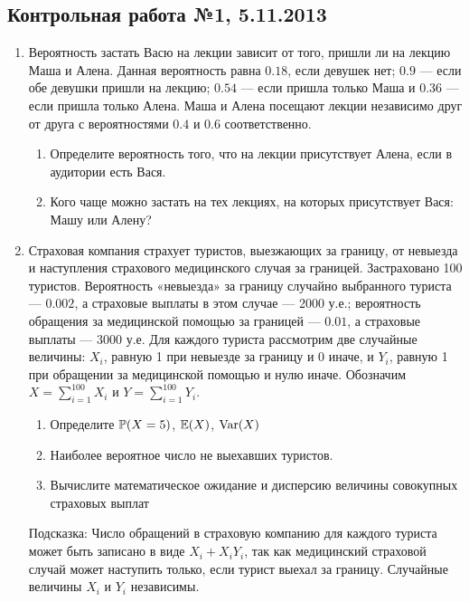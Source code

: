 \subsection{Контрольная работа №1, 5.11.2013}

\begin{enumerate}
\item Вероятность застать Васю на лекции зависит от того, пришли ли на лекцию Маша и Алена. Данная вероятность равна $0.18$, если девушек нет; $0.9$ — если обе девушки пришли на лекцию; $0.54$ — если пришла только Маша и $0.36$ — если пришла только Алена. Маша и Алена посещают лекции независимо друг от друга с вероятностями $0.4$ и $0.6$ соответственно.
\begin{enumerate}
\item Определите вероятность того, что на лекции присутствует Алена, если в аудитории есть Вася.
\item Кого чаще можно застать на тех лекциях, на которых присутствует Вася: Машу или Алену?
\end{enumerate}


\item Страховая компания страхует туристов, выезжающих за границу, от невыезда и наступления страхового медицинского случая за границей. Застраховано 100 туристов. Вероятность «невыезда» за границу случайно выбранного туриста — $0.002$, а страховые выплаты в этом случае — 2000 у.е.; вероятность обращения за медицинской помощью за границей — $0.01$, а страховые выплаты — 3000 у.е. Для каждого туриста рассмотрим две случайные величины: $X_i$, равную 1 при невыезде за границу и 0 иначе, и $Y_i$, равную 1 при обращении за медицинской помощью и нулю иначе. Обозначим $X=\sum_{i=1}^{100}X_i$ и $Y=\sum_{i=1}^{100}Y_i$.
\begin{enumerate}
\item Определите $\P(X=5)$, $\E(X)$, $\Var(X)$
\item Наиболее вероятное число не выехавших туристов.
\item Вычислите математическое ожидание и дисперсию величины совокупных страховых выплат
\end{enumerate}
Подсказка: Число обращений в страховую компанию для каждого туриста может быть записано в виде $X_i+X_i Y_i$, так как медицинский страховой случай может наступить только, если турист выехал за границу. Случайные величины $X_i$ и $Y_i$ независимы.


\end{enumerate}
